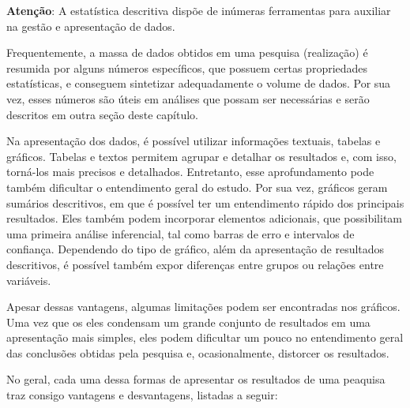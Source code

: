 \documentclass[
]{book}
\begin{document}
\begin{warning}

\textbf{Atenção}: A estatística descritiva dispõe de inúmeras ferramentas para auxiliar na gestão e apresentação de dados.

\end{warning}

Frequentemente, a massa de dados obtidos em uma pesquisa (realização) é resumida por alguns números específicos, que possuem certas propriedades estatísticas, e conseguem sintetizar adequadamente o volume de dados. Por sua vez, esses números são úteis em análises que possam ser necessárias e serão descritos em outra seção deste capítulo.

Na apresentação dos dados, é possível utilizar informações textuais, tabelas e gráficos. Tabelas e textos permitem agrupar e detalhar os resultados e, com isso, torná-los mais precisos e detalhados. Entretanto, esse aprofundamento pode também dificultar o entendimento geral do estudo. Por sua vez, gráficos geram sumários descritivos, em que é possível ter um entendimento rápido dos principais resultados. Eles também podem incorporar elementos adicionais, que possibilitam uma primeira análise inferencial, tal como barras de erro e intervalos de confiança. Dependendo do tipo de gráfico, além da apresentação de resultados descritivos, é possível também expor diferenças entre grupos ou relações entre variáveis.

Apesar dessas vantagens, algumas limitações podem ser encontradas nos gráficos. Uma vez que os eles condensam um grande conjunto de resultados em uma apresentação mais simples, eles podem dificultar um pouco no entendimento geral das conclusões obtidas pela pesquisa e, ocasionalmente, distorcer os resultados.

No geral, cada uma dessa formas de apresentar os resultados de uma peaquisa traz consigo vantagens e desvantagens, listadas a seguir:
\end{document}
